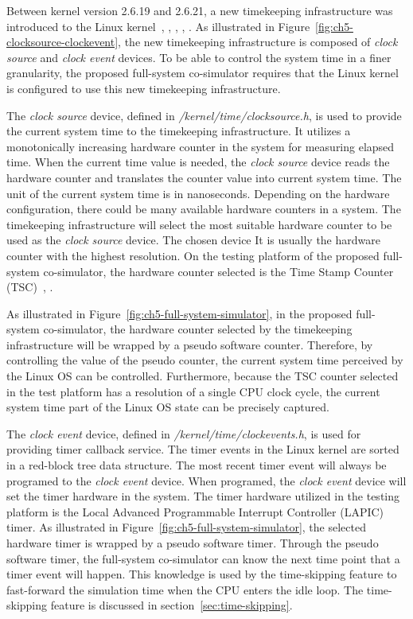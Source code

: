 Between kernel version 2.6.19 and 2.6.21, a new timekeeping infrastructure was introduced to the Linux kernel~\cite{Stultz:2005}, \cite{GleixnerNiehaus:2006}, \cite{GleixnerMolnar:2006}, \cite{Gleixner:2007}, \cite{Kerrisk:2012}. As illustrated in Figure~\ref{fig:ch5-clocksource-clockevent}, the new timekeeping infrastructure is composed of \textit{clock source} and \textit{clock event} devices. To be able to control the system time in a finer granularity, the proposed full-system co-simulator requires that the Linux kernel is configured to use this new timekeeping infrastructure.

The \textit{clock source} device, defined in \textit{/kernel/time/clocksource.h}, is used to provide the current system time to the timekeeping infrastructure. It utilizes a monotonically increasing hardware counter in the system for measuring elapsed time. When the current time value is needed, the \textit{clock source} device reads the hardware counter and translates the counter value into current system time. The unit of the current system time is in nanoseconds. Depending on the hardware configuration, there could be many available hardware counters in a system. The timekeeping infrastructure will select the most suitable hardware counter to be used as the \textit{clock source} device. The chosen device It is usually the hardware counter with the highest resolution. On the testing platform of the proposed full-system co-simulator, the hardware counter selected is the Time Stamp Counter (TSC)~\cite{Intel:1997}, \cite{wiki:TSC}.

As illustrated in Figure~\ref{fig:ch5-full-system-simulator}, in the proposed full-system co-simulator, the hardware counter selected by the timekeeping infrastructure will be wrapped by a pseudo software counter. Therefore, by controlling the value of the pseudo counter, the current system time perceived by the Linux OS can be controlled. Furthermore, because the TSC counter selected in the test platform has a resolution of a single CPU clock cycle, the current system time part of the Linux OS state can be precisely captured.

The \textit{clock event} device, defined in \textit{/kernel/time/clockevents.h}, is used for providing timer callback service. The timer events in the Linux kernel are sorted in a red-block tree data structure. The most recent timer event will always be programed to the \textit{clock event} device. When programed, the \textit{clock event} device will set the timer hardware in the system. The timer hardware utilized in the testing platform is the Local Advanced Programmable Interrupt Controller (LAPIC) timer. As illustrated in Figure~\ref{fig:ch5-full-system-simulator}, the selected hardware timer is wrapped by a pseudo software timer. Through the pseudo software timer, the full-system co-simulator can know the next time point that a timer event will happen. This knowledge is used by the time-skipping feature to fast-forward the simulation time when the CPU enters the idle loop. The time-skipping feature is discussed in section~\ref{sec:time-skipping}.

